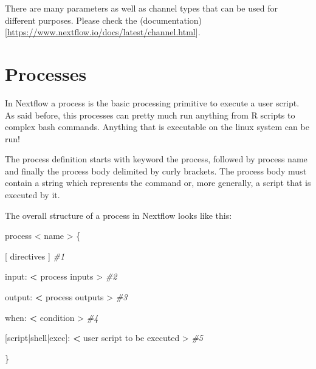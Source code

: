 \documentclass[
]{book}
\newenvironment{Shaded}{\begin{snugshade}}{\end{snugshade}}
\newcommand{\CommentTok}[1]{\textcolor[rgb]{0.56,0.35,0.01}{\textit{#1}}}
\newcommand{\ErrorTok}[1]{\textcolor[rgb]{0.64,0.00,0.00}{\textbf{#1}}}
\newcommand{\NormalTok}[1]{#1}
\newcommand{\SpecialCharTok}[1]{\textcolor[rgb]{0.00,0.00,0.00}{#1}}
\begin{document}
There are many parameters as well as channel types that can be used for different purposes. Please check the (documentation){[}\url{https://www.nextflow.io/docs/latest/channel.html}{]}.

\hypertarget{processes}{%
\chapter{Processes}\label{processes}}

In Nextflow a process is the basic processing primitive to execute a user script. As said before, this processes can pretty much run anything from R scripts to complex bash commands. Anything that is executable on the linux system can be run!

The process definition starts with keyword the process, followed by process name and finally the process body delimited by curly brackets. The process body must contain a string which represents the command or, more generally, a script that is executed by it.

The overall structure of a process in Nextflow looks like this:

\begin{Shaded}
\begin{Highlighting}[numbers=left,,]
\NormalTok{process }\SpecialCharTok{\textless{}}\NormalTok{ name }\SpecialCharTok{\textgreater{}}\NormalTok{ \{}

\NormalTok{   [ directives ] }\CommentTok{\#1}

\NormalTok{   input}\SpecialCharTok{:}
    \ErrorTok{\textless{}}\NormalTok{ process inputs }\SpecialCharTok{\textgreater{}} \CommentTok{\#2}

\NormalTok{   output}\SpecialCharTok{:}
    \ErrorTok{\textless{}}\NormalTok{ process outputs }\SpecialCharTok{\textgreater{}} \CommentTok{\#3}

\NormalTok{   when}\SpecialCharTok{:}
    \ErrorTok{\textless{}}\NormalTok{ condition }\SpecialCharTok{\textgreater{}} \CommentTok{\#4}

\NormalTok{   [script}\SpecialCharTok{|}\NormalTok{shell}\SpecialCharTok{|}\NormalTok{exec]}\SpecialCharTok{:}
   \ErrorTok{\textless{}}\NormalTok{ user script to be executed }\SpecialCharTok{\textgreater{}} \CommentTok{\#5}

\NormalTok{\}}
\end{Highlighting}
\end{Shaded}
\end{document}
